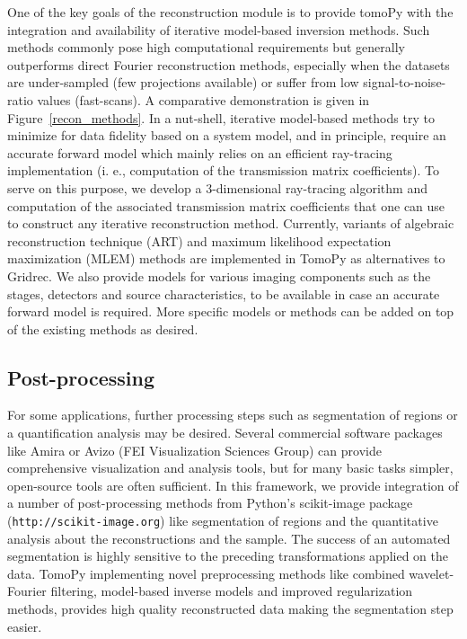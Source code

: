 \documentclass[pdf]{iucr}              %
\begin{document}
One of the key goals of the reconstruction module is to provide tomoPy with the integration and availability of iterative model-based inversion methods. Such methods commonly pose high computational requirements but generally outperforms direct Fourier reconstruction methods, especially when the datasets are under-sampled (few projections available) or suffer from low signal-to-noise-ratio values (fast-scans). A comparative demonstration is given in Figure~\ref{recon_methods}. In a nut-shell, iterative model-based methods try to minimize for data fidelity based on a system model, and in principle, require an accurate forward model which mainly relies on an efficient ray-tracing implementation (i. e., computation of the transmission matrix coefficients). To serve on this purpose, we develop a 3-dimensional ray-tracing algorithm and computation of the associated transmission matrix coefficients that one can use to construct any iterative reconstruction method. Currently, variants of algebraic reconstruction technique (ART) \cite{Gordon1970}  and maximum likelihood expectation maximization (MLEM) \cite{Dempster1977} methods are implemented in TomoPy as alternatives to Gridrec. We also provide models for various imaging components such as the stages, detectors and source characteristics, to be available in case an accurate forward model is required. More specific models or methods can be added on top of the existing methods as desired.

\subsection{Post-processing}

For some applications, further processing steps such as segmentation of regions or a quantification analysis may be desired. Several commercial software packages like Amira or Avizo (FEI Visualization Sciences Group) can provide comprehensive visualization and analysis tools, but for many basic tasks simpler, open-source tools are often sufficient. In this framework, we provide integration of a number of post-processing methods from Python's scikit-image package (\texttt{http://scikit-image.org}) like segmentation of regions and the quantitative analysis about the reconstructions and the sample. The success of an automated segmentation is highly sensitive to the preceding transformations applied on the data. TomoPy  implementing novel preprocessing methods like combined wavelet-Fourier filtering, model-based inverse models and improved regularization methods, provides high quality reconstructed data making the segmentation step easier. 
\end{document}
